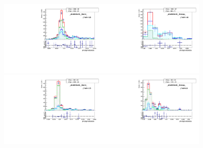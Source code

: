 \begin{figure}[htb]
  \begin{center}
   \includegraphics[width=0.45\textwidth]{../figs/figs_v11/MUON_WGamma/MCclosureWjetsPlusWg/c_TEMPL_SIHIH_UNblind__phoEt35to45__Barrel__RooFit_MCclosure.pdf}\includegraphics[width=0.45\textwidth]{../figs/figs_v11/MUON_WGamma/MCclosureWjetsPlusWg/c_TEMPL_SIHIH_UNblind__phoEt35to45__Endcap__RooFit_MCclosure.pdf}\\
   \includegraphics[width=0.45\textwidth]{../figs/figs_v11/MUON_WGamma/MCclosureWjetsPlusWg/c_TEMPL_SIHIH_UNblind__phoEt45to55__Barrel__RooFit_MCclosure.pdf}\includegraphics[width=0.45\textwidth]{../figs/figs_v11/MUON_WGamma/MCclosureWjetsPlusWg/c_TEMPL_SIHIH_UNblind__phoEt45to55__Endcap__RooFit_MCclosure.pdf}\\

\end{center}
\end{figure}
